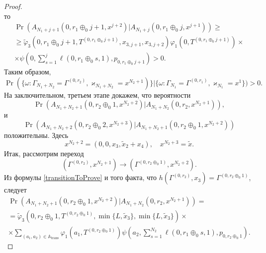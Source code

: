 \begin{proof}
\begin{equation*}
\end{equation*}
то
\begin{multline*}
\Pr( A_{N_1 + j + 1} (0,  r_1 \oplus_0 j + 1,  x^{j+2})
|A_{N_1 + j} (0,  r_1 \oplus_0 j,  x^{j+1}))
\geqslant \\
\geqslant \widetilde{\varphi}_3(0, r_1 \oplus_0 j + 1,  T^{(0, r_1 \oplus_0 j + 1)},  x_{3,  j + 1}, x_{3,  j + 2})
\varphi_1(0,  T^{(0,  r_1 \oplus_0 j + 1)})\times \\
\times\psi(0,  \sum_{s=1}^{j} \ell(0, r_1 \oplus_0 s, 1),  p_{0,  r_1 \oplus_0 j + 1})  > 0.
\end{multline*}
Таким образом, 
\begin{equation*}
\Pr(\{\omega\colon \Gamma_{N_1+N_2}=\Gamma^{(0, r_2)},  \varkappa_{N_1+N_2}=x^{N_2 + 1})\}|\{\omega\colon 
\Gamma_{N_1}=\Gamma^{(0, r_1)},  \varkappa_{N_1}=x^{1}\})>0.
\end{equation*}
На заключительном,  третьем этапе докажем,  что вероятности
\begin{equation*}
\Pr(A_{N_1+N_2+1}(0, r_2\oplus_0 1, x^{N_2+2})|A_{N_1+N_2}(0, r_2, x^{N_2 + 1}) ), 
\end{equation*}
и 
\begin{equation*}
\Pr(A_{N_1+N_2+2}(0, r_2\oplus_0 2, x^{N_2+3})|A_{N_1+N_2+1}(0, r_2\oplus_0 1, x^{N_2+2}) )
\end{equation*}
положительны.  Здесь 
\begin{equation*}
x^{N_2 + 2} = (0, 0, x_3, \tilde{x}_2+x_4),  \quad x^{N_2 + 3} = \tilde{x}.
\end{equation*}
Итак,  рассмотрим переход 
$$
(\Gamma^{(0,  r_2)},  x^{N_2+1}) \rightarrow (\Gamma^{(0,  r_2 \oplus_0 1)},  x^{N_2+2}).
$$
Из формулы \eqref{transitionToProve} и того факта,  что $h(\Gamma^{(0,  r_2)},  x_3) = \Gamma^{(0,  r_2 \oplus_0 1 )}$,  следует
\begin{multline*}
\Pr( A_{N_1 + N_2 + 1} (0,  r_2 \oplus_0 1,  x^{N_2+2})
|A_{N_1 + N_2} (0,  r_2,  x^{N_2 + 1}) )
=\\
=\widetilde{\varphi}_3(0,  r_2 \oplus_0 1,  T^{(0,  r_2 \oplus_0 1)},  \min\{L,  \tilde{x}_3\},  \min\{L,  \tilde{x}_3\}) 
\times \\ \times
\sum_{(a_1,  a_2)\in {\mathbb A}_{\mathrm{trans}}}\varphi_1(a_1,  T^{(0,  r_2 \oplus_0 1)}) \psi(a_2,  \sum_{s=1}^{N_2} \ell(0, r_1 \oplus_0 s, 1) ,  p_{0,  r_2 \oplus_0  1}).

\end{multline*}
\end{proof}
